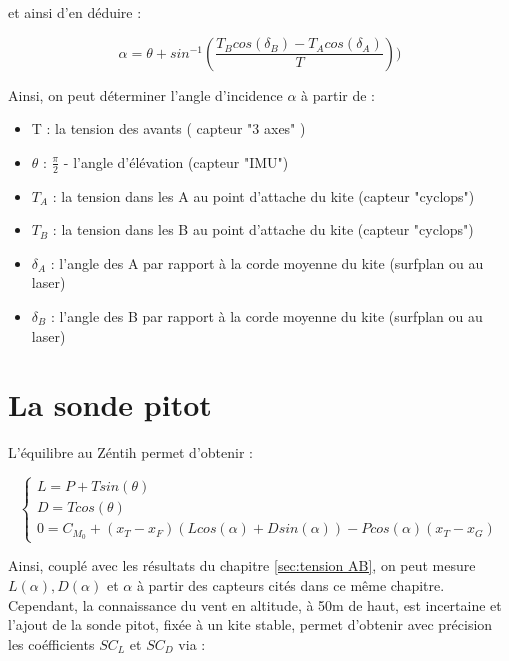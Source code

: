 et ainsi d'en déduire :

\begin{center}
    \begin{equation}
        \alpha = \theta + sin^{-1}(\frac{T_B cos(\delta_B) - T_A cos(\delta_A)}{T}))
        \label{eq:alpha}
    \end{equation}
\end{center}

Ainsi, on peut déterminer l'angle d'incidence $\alpha$ à partir de :
\begin{itemize}
    \item T : la tension des avants ( capteur "3 axes" )
    \item $\theta$ : $\frac{\pi}{2}$ - l'angle d'élévation (capteur "IMU")
    \item $T_A$ : la tension dans les A au point d'attache du kite (capteur "cyclops")
    \item $T_B$ : la tension dans les B au point d'attache du kite (capteur "cyclops")
    \item $\delta_A$ : l'angle des A par rapport à la corde moyenne du kite (surfplan ou au laser)
    \item $\delta_B$ : l'angle des B par rapport à la corde moyenne du kite (surfplan ou au laser)
\end{itemize}

\section{La sonde pitot} 
\label{sec:Ch2.3}

L'équilibre au Zéntih permet d'obtenir : 

\begin{equation}
    \begin{cases}
        L = P + T sin(\theta) \\
        D = T cos(\theta) \\
        0 = C_{M_0} + (x_T - x_F) (L cos(\alpha) + D sin(\alpha)) - P cos(\alpha) (x_T - x_G)
    \end{cases}
    \label{eq:equilibre aero}
\end{equation}


Ainsi, couplé avec les résultats du chapitre \ref{sec:tension AB}, on peut mesure $L(\alpha), D(\alpha)$ et $\alpha$ à partir des capteurs cités dans ce même chapitre. 
Cependant, la connaissance du vent en altitude, à 50m de haut, est incertaine et l'ajout de la sonde pitot, fixée à un kite stable, permet d'obtenir avec précision les coéfficients $SC_L$ et $SC_D$ via :

